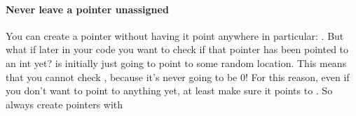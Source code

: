 \paragraph{Never leave a pointer unassigned} You can create a pointer without having it point anywhere in particular: . But what if later in your code you want to check if that pointer has been pointed to an int yet?  is initially just going to point to some random location. This means that you cannot check , because it's never going to be 0! For this reason, even if you don't want  to point to anything yet, at least make sure it points to . So always create pointers with 
